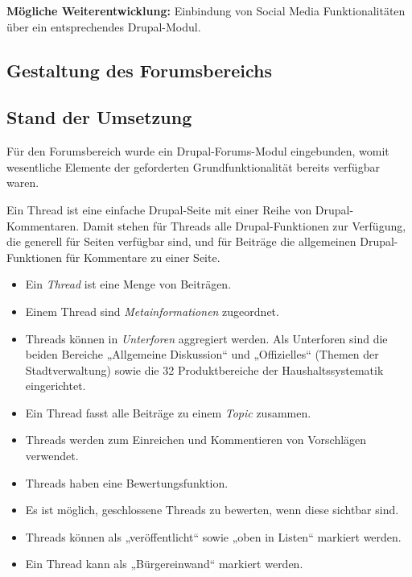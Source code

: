 \documentclass[11pt,a4paper,twoside]{article}
\begin{document}
\textbf{Mögliche Weiterentwicklung:} Einbindung von Social Media
Funktionalitäten über ein entsprechendes Drupal-Modul.

\subsection{Gestaltung des Forumsbereichs} 

\subsection*{Stand der Umsetzung} 

Für den Forumsbereich wurde ein Drupal-Forums-Modul eingebunden, womit
wesentliche Elemente der geforderten Grundfunktionalität bereits verfügbar
waren. 

Ein Thread ist eine einfache Drupal-Seite mit einer Reihe von
Drupal-Kommentaren.  Damit stehen für Threads alle Drupal-Funktionen zur
Verfügung, die generell für Seiten verfügbar sind, und für Beiträge die
allgemeinen Drupal-Funktionen für Kommentare zu einer Seite.

\begin{itemize}\itemsep0pt
\item Ein \emph{Thread} ist eine Menge von Beiträgen. 
\item Einem Thread sind \emph{Metainformationen} zugeordnet.
\item Threads können in \emph{Unterforen} aggregiert werden. Als Unterforen
  sind die beiden Bereiche „Allgemeine Diskussion“ und „Offizielles“ (Themen
  der Stadtverwaltung) sowie die 32 Produktbereiche der Haushaltssystematik
  eingerichtet.
\item Ein Thread fasst alle Beiträge zu einem \emph{Topic} zusammen. 
\item Threads werden zum Einreichen und Kommentieren von Vorschlägen verwendet.
\item Threads haben eine Bewertungsfunktion.
\item Es ist möglich, geschlossene Threads zu bewerten, wenn diese sichtbar
  sind.  
\item Threads können als „veröffentlicht“ sowie „oben in Listen“ markiert
  werden.  
\item Ein Thread kann als „Bürgereinwand“ markiert werden.
\end{itemize}
\pagebreak[3]
\end{document}
